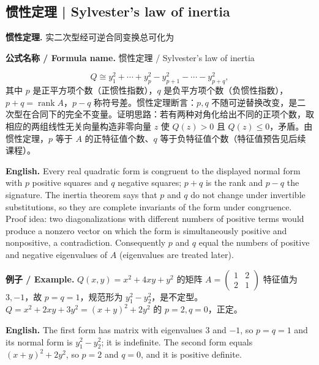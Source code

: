 \documentclass[UTF8,11pt,a4paper]{ctexart}
\newcommand{\EN}[1]{\par\noindent\textbf{English.} #1\par}
\newcommand{\FORMULA}[2]{\par\noindent\textbf{公式名称 / Formula name.} #1 / #2\par}
\newcommand{\EX}[2]{\par\noindent\textbf{例子 / Example.} #1\par\EN{#2}}
\begin{document}
\subsection{惯性定理 | Sylvester's law of inertia}
\noindent\textbf{惯性定理.} 实二次型经可逆合同变换总可化为
\FORMULA{惯性定理}{Sylvester's law of inertia}
\[
Q\cong y_1^2+\cdots+y_p^2-y_{p+1}^2-\cdots-y_{p+q}^2,
\]
其中 $p$ 是正平方项个数（正惯性指数），$q$ 是负平方项个数（负惯性指数），$p+q=\operatorname{rank}A$，$p-q$ 称符号差。惯性定理断言：$p,q$ 不随可逆替换改变，是二次型在合同下的完全不变量。证明思路：若有两种对角化给出不同的正项个数，取相应的两组线性无关向量构造非零向量 $z$ 使 $Q(z)>0$ 且 $Q(z)\le0$，矛盾。由惯性定理，$p$ 等于 $A$ 的正特征值个数、$q$ 等于负特征值个数（特征值预告见后续课程）。
\EN{Every real quadratic form is congruent to the displayed normal form with $p$ positive squares and $q$ negative squares; $p+q$ is the rank and $p-q$ the signature. The inertia theorem says that $p$ and $q$ do not change under invertible substitutions, so they are complete invariants of the form under congruence. Proof idea: two diagonalizations with different numbers of positive terms would produce a nonzero vector on which the form is simultaneously positive and nonpositive, a contradiction. Consequently $p$ and $q$ equal the numbers of positive and negative eigenvalues of $A$ (eigenvalues are treated later).}
\EX{$Q(x,y)=x^2+4xy+y^2$ 的矩阵 $A=\begin{pmatrix}1&2\\2&1\end{pmatrix}$ 特征值为 $3,-1$，故 $p=q=1$，规范形为 $y_1^2-y_2^2$，是不定型。$Q=x^2+2xy+3y^2=(x+y)^2+2y^2$ 的 $p=2,q=0$，正定。}{The first form has matrix with eigenvalues $3$ and $-1$, so $p=q=1$ and its normal form is $y_1^2-y_2^2$; it is indefinite. The second form equals $(x+y)^2+2y^2$, so $p=2$ and $q=0$, and it is positive definite.}
\end{document}
